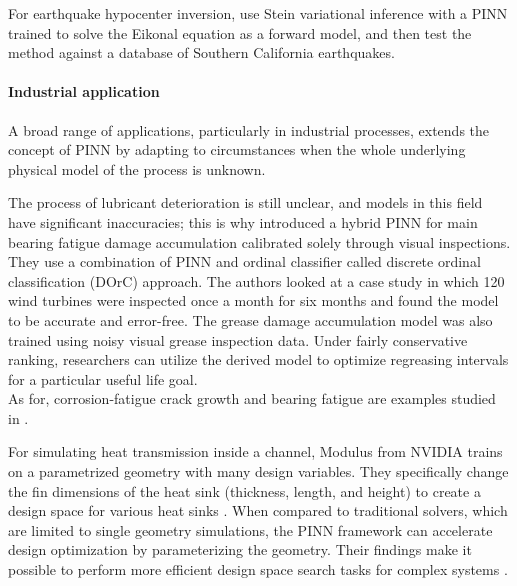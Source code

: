 \documentclass[pdflatex,sn-basic]{sn-jnl}%
\theoremstyle{thmstyleone}%
\theoremstyle{thmstyletwo}%
\theoremstyle{thmstylethree}%
\begin{document}
For earthquake hypocenter inversion, \cite{Smi2021_HyposviHypocentreInversion_RosSRAM}
 use Stein variational inference with a PINN trained to solve the Eikonal equation as a forward model, and then test the method against a database of Southern California earthquakes. 




\paragraph{Industrial application}
A broad range of applications, particularly in industrial processes, extends the concept of PINN by adapting to circumstances when the whole underlying physical model of the process is unknown. 


The process of lubricant deterioration is still unclear, and models in this field have significant inaccuracies; this is why
\cite{Yuc2021_HybridPhysicsInformed_ViaYV}
introduced a hybrid PINN for main bearing fatigue damage accumulation calibrated solely through visual inspections.
They use a combination of PINN and ordinal classifier called discrete ordinal classification (DOrC) approach.
The authors looked at a case study in which 120 wind turbines were inspected once a month for six months and found the model to be accurate and error-free. The grease damage accumulation model was also trained using noisy visual grease inspection data.
Under fairly conservative ranking, researchers can utilize the derived model to optimize regreasing intervals for a particular useful life goal.
%
\\
\noindent
As for, corrosion-fatigue crack growth and bearing fatigue are examples studied in \cite{Via2021_EstimatingModelInadequacy_NasVNDY}.

For simulating heat transmission inside a channel,  Modulus from NVIDIA \citep{Hen2021_NvidiaSimnetAi_NarHNN}  trains on a parametrized geometry with many design variables. 
They specifically change the fin dimensions of the heat sink (thickness, length, and height) to create a design space for various heat sinks \citep{Modulus2021}.
When compared to traditional solvers, which are limited to single geometry simulations, the PINN framework can accelerate design optimization by parameterizing the geometry.
Their findings make it possible to perform more efficient design space search tasks for complex systems \citep{Cai2021_PhysicsInformedNeural_WanCWW}.
\end{document}
